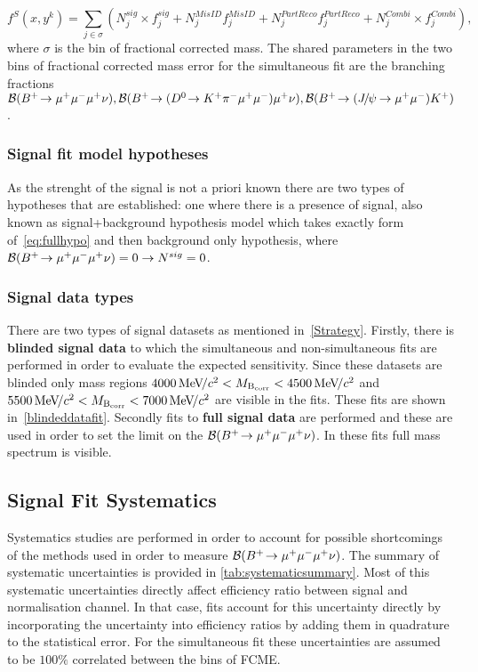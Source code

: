 \begin{equation}
f^{S}(x,y^{k})=\sum_{j\in{\sigma}}(N_{j}^{sig}\times f_{j}^{sig} + N_{j}^{MisID}f_{j}^{MisID} + N_{j}^{PartReco}f_{j}^{PartReco} + N_{j}^{Combi} \times f_{j}^{Combi}),
\label{eq:fullhypo2}
\end{equation}
where $\sigma$ is the bin of fractional corrected mass. The shared parameters in the two bins of fractional corrected mass error for the simultaneous fit are the branching fractions $\mathcal{B}({{{B}^+}}\!\rightarrow {\ensuremath{\mu^+\mu^-\mu^+}}\nu),\mathcal{B}({{{B}^+}}\!\rightarrow ({{D}^0}\!\rightarrow {\ensuremath{{K}^+}}{\ensuremath{{\pi}^-}}{\ensuremath{\mu^+\mu^-}}){\mu^+}\nu),\mathcal{B}({{{B}^+}}\!\rightarrow ({{J\mskip -3mu/\mskip -2mu\psi\mskip 2mu}}\!\rightarrow {\ensuremath{\mu^+\mu^-}}){{K}^+})$. 

\subsubsection{Signal fit model hypotheses}
As the strenght of the signal is not a priori known there are two types of hypotheses that are established: one where there is a presence of signal, also known as signal+background hypothesis model which takes exactly form of~\autoref{eq:fullhypo} and then background only hypothesis, where $\mathcal{B}({{{B}^+}}\!\rightarrow {\ensuremath{\mu^+\mu^-\mu^+}}\nu)=0 \rightarrow N^{sig}=0$.

\subsubsection{Signal data types}

There are two types of signal datasets as mentioned in~\autoref{Strategy}. Firstly, there is \textbf{blinded signal data} to which the simultaneous and non-simultaneous fits are performed in order to evaluate the expected sensitivity. Since these datasets are blinded only mass regions $4000{{\mathrm{\,Me\kern -0.1em V\!/}c^2}}<M_{\rm{B_{corr}}}<{4500{\mathrm{\,Me\kern -0.1em V\!/}c^2}}$ and $5500{{\mathrm{\,Me\kern -0.1em V\!/}c^2}}<M_{\rm{B_{corr}}}<{7000{\mathrm{\,Me\kern -0.1em V\!/}c^2}}$ are visible in the fits. These fits are shown in~\autoref{blindeddatafit}. Secondly fits to \textbf{full signal data} are performed and these are used in order to set the limit on the $\mathcal{B}({{{B}^+}}\!\rightarrow {\ensuremath{\mu^+\mu^-\mu^+}}\nu)$. In these fits full mass spectrum is visible.

\subsection{Signal Fit Systematics}
Systematics studies are performed in order to account for possible shortcomings of the methods used in order to measure $\mathcal{B}({{{B}^+}}\!\rightarrow {\ensuremath{\mu^+\mu^-\mu^+}}\nu)$. The summary of systematic uncertainties is provided in \autoref{tab:systematicsummary}. Most of this systematic uncertainties directly affect efficiency ratio between signal and normalisation channel. In that case, fits account for this uncertainty directly by incorporating the uncertainty into efficiency ratios by adding them in quadrature to the statistical error. For the simultaneous fit these uncertainties are assumed to be $100\%$ correlated between the bins of FCME.


